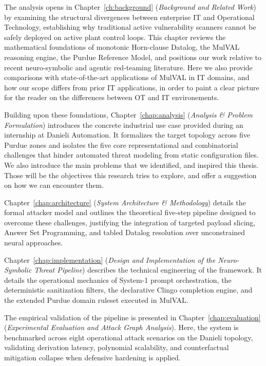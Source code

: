 \documentclass[target=mst,aauheader=aics,style=]{thud}
\begin{document}
The analysis opens in Chapter~\ref{ch:background} (\textit{Background and Related Work}) by examining the structural divergences between enterprise IT and Operational Technology, establishing why traditional active vulnerability scanners cannot be safely deployed on active plant control loops. This chapter reviews the mathematical foundations of monotonic Horn-clause Datalog, the MulVAL reasoning engine, the Purdue Reference Model, and positions our work relative to recent neuro-symbolic and agentic red-teaming literature. Here we also provide comparisons with state-of-the-art applications of MulVAL in IT domains, and how our scope differs from prior IT applications, in order to paint a clear picture for the reader on the differences between OT and IT environements.

Building upon these foundations, Chapter~\ref{chap:analysis} (\textit{Analysis \& Problem Formulation}) introduces the concrete industrial use case provided during an internship at Danieli Automation. It formalizes the target topology across five Purdue zones and isolates the five core representational and combinatorial challenges that hinder automated threat modeling from static configuration files. We also introduce the main problems that we identified, and inspired this thesis. Those will be the objectives this research tries to explore, and offer a suggestion on how we can encounter them.

Chapter~\ref{chap:architecture} (\textit{System Architecture \& Methodology}) details the formal attacker model and outlines the theoretical five-step pipeline designed to overcome these challenges, justifying the integration of targeted payload slicing, Answer Set Programming, and tabled Datalog resolution over unconstrained neural approaches.

Chapter~\ref{chap:implementation} (\textit{Design and Implementation of the Neuro-Symbolic Threat Pipeline}) describes the technical engineering of the framework. It details the operational mechanics of System-1 prompt orchestration, the deterministic sanitization filters, the declarative Clingo completion engine, and the extended Purdue domain ruleset executed in MulVAL.

The empirical validation of the pipeline is presented in Chapter~\ref{chap:evaluation} (\textit{Experimental Evaluation and Attack Graph Analysis}). Here, the system is benchmarked across eight operational attack scenarios on the Danieli topology, validating derivation latency, polynomial scalability, and counterfactual mitigation collapse when defensive hardening is applied.
\end{document}
